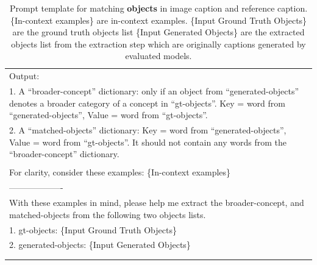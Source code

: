 \begin{table}[h!]
\begin{minipage}{0.95\textwidth}
\begin{tcolorbox}
\begin{tabular}{p{}}
        Output:\\
        1.  A ``broader-concept'' dictionary: only if an object from ``generated-objects'' denotes a broader category of a concept in ``gt-objects''. Key = word from ``generated-objects'', Value = word from ``gt-objects''. \\
        2. A ``matched-objects'' dictionary: Key = word from ``generated-objects'', Value = word from ``gt-objects''. 
        It should not contain any words from the ``broader-concept'' dictionary.\\\\
        For clarity, consider these examples: \textcolor[rgb]{0,0.7,0}{ \{In-context examples\} } \\
------------------- \\
        With these examples in mind, please help me extract the broader-concept, and matched-objects from the following two objects lists. \\ 
        1. gt-objects: \textcolor[rgb]{0.8,0,0}{\{Input Ground Truth Objects\}}  \\
        2. generated-objects: \textcolor[rgb]{0.8,0,0}{\{Input Generated Objects\}} \\\\
\\

    \end{tabular}
\end{tcolorbox}
\caption{Prompt template for matching \textbf{objects} in image caption and reference caption.
\textcolor[rgb]{0,0.7,0}{ \{In-context examples\} } are in-context examples. \textcolor[rgb]{0.8,0,0}{\{Input Ground Truth Objects\}} are the ground truth objects list
\textcolor[rgb]{0.8,0,0}{\{Input Generated Objects\}} are the extracted objects list from the extraction step which are originally captions generated by evaluated models.}
    \label{tab:matching_obj}
\end{minipage}
\end{table}

